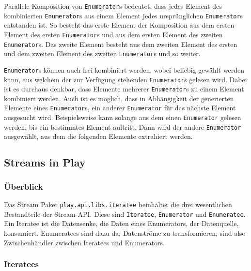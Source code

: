 \documentclass[draft=false
              ,paper=a4
              ,twoside=false
              ,fontsize=11pt
              ,headsepline
              ,BCOR10mm
              ,DIV11
              ]{scrbook}
\begin{document}
Parallele Komposition von \lstinline|Enumerator|s bedeutet, dass jedes Element des kombinierten \lstinline|Enumerator|s aus einem Element jedes ursprünglichen \lstinline|Enumerator|s entstanden ist.
So besteht das erste Element der Komposition aus dem ersten Element des ersten \lstinline|Enumerator|s und aus dem ersten Element des zweiten \lstinline|Enumerator|s.
Das zweite Element besteht aus dem zweiten Element des ersten und dem zweiten Element des zweiten \lstinline|Enumerator|s und so weiter.

\lstinline|Enumerator|s können auch frei kombiniert werden, wobei beliebig gewählt werden kann, aus welchem der zur Verfügung stehenden \lstinline|Enumerator|s gelesen wird.
Dabei ist es durchaus denkbar, dass Elemente mehrerer \lstinline|Enumerator|s zu einem Element kombiniert werden.
Auch ist es möglich, dass in Abhängigkeit der generierten Elemente eines \lstinline|Enumerator|s, ein anderer \lstinline|Enumerator| für das nächste Element ausgesucht wird.
Beispielsweise kann solange aus dem einen \lstinline|Enumerator| gelesen werden, bis ein bestimmtes Element auftritt.
Dann wird der andere \lstinline|Enumerator| ausgewählt, aus dem die folgenden Elemente extrahiert werden.






\subsection{Streams in Play} %
\label{sub:streams_in_play}


\subsubsection{Überblick} %
\label{sssec:streams_ueberblick}

Das Stream Paket \lstinline|play.api.libs.iteratee| beinhaltet die drei wesentlichen Bestandteile der Stream-API.
Diese sind \lstinline|Iteratee|, \lstinline|Enumerator| und \lstinline|Enumeratee|.
Ein Iteratee ist die Datensenke, die Daten eines Enumerators, der Datenquelle, konsumiert.
Enumeratees sind dazu da, Datenströme zu transformieren, sind also Zwischenhändler zwischen Iteratees und Enumerators.



\subsubsection{Iteratees} %
\label{sssec:iteratees}
\end{document}
